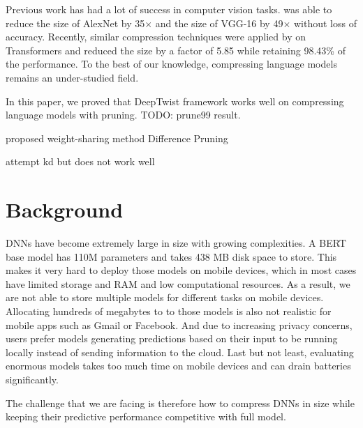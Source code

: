 \documentclass[10pt]{article}
\begin{document}
Previous work has had a lot of success in computer vision tasks.
\citet{han2015deep} was able to reduce the size of AlexNet by 35$\times$ and
the size of VGG-16 by 49$\times$ without loss of accuracy. Recently, similar
compression techniques were applied by \citet{cheong2014transformer} on
Transformers and reduced the size by a factor of 5.85 while retaining 98.43\%
of the performance. To the best of our knowledge, compressing language models
remains an under-studied field.

In this paper, we proved that DeepTwist framework works well on compressing
language models with pruning. {\color{red} TODO: prune99 result}.

proposed weight-sharing method Difference Pruning

attempt kd but does not work well


\section{Background}


DNNs have become extremely large in size with growing complexities. A BERT
base model has 110M parameters and takes 438 MB disk space to store. This
makes it very hard to deploy those models on mobile devices, which in most
cases have limited storage and RAM and low computational resources. As a
result, we are not able to store multiple models for different tasks on mobile
devices. Allocating hundreds of megabytes to to those models is also not
realistic for mobile apps such as Gmail or Facebook. And due to increasing
privacy concerns, users prefer models generating predictions based on their
input to be running locally instead of sending information to the cloud. Last
but not least, evaluating enormous models takes too much time on mobile
devices and can drain batteries significantly.

The challenge that we are facing is therefore how to compress DNNs in size
while keeping their predictive performance competitive with full model.
\end{document}
